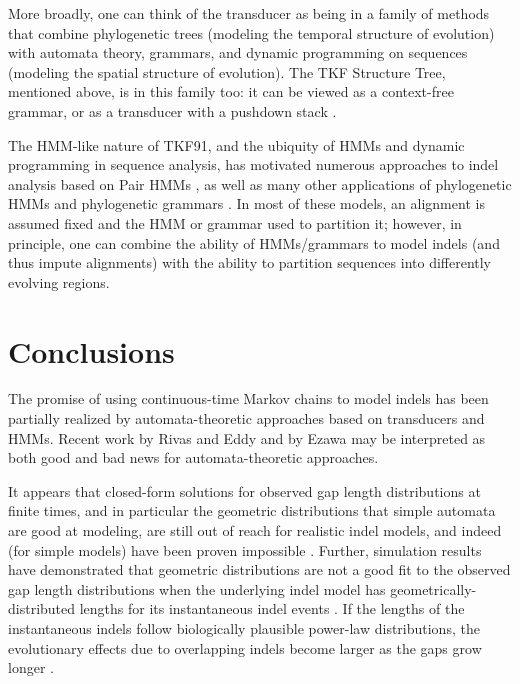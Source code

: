 \documentclass{bmcart}
\begin{document}
More broadly, one can think of the transducer as being in a family of methods
that combine phylogenetic trees (modeling the temporal structure of evolution)
with automata theory, grammars, and dynamic programming on sequences (modeling the spatial structure of evolution).
The TKF Structure Tree, mentioned above, is in this family too:
it can be viewed as a context-free grammar, or as a transducer with a pushdown stack \cite{Holmes2004}.

The HMM-like nature of TKF91, and the ubiquity of HMMs and dynamic programming in sequence analysis,
has motivated numerous approaches to indel analysis based on Pair HMMs
\cite{ThorneEtal92,KnudsenMiyamoto2003,WangKeightleyJohnson2006,RivasEddy2008,RivasEddy2015},
as well as many other applications of 
phylogenetic HMMs \cite{FelsensteinChurchill96,GoldmanEtAl96,PedersenHein2003,SiepelHaussler04,SiepelHaussler04b}
and phylogenetic grammars \cite{KnudsenHein99,KnudsenHein2003,PedersenEtAl04,PedersenEtAl2006,KlostermanEtAl2006,pmid22693624}.
In most of these models, an alignment is assumed fixed and the HMM or grammar used to partition it;
however, in principle, one can combine the ability of HMMs/grammars to model indels (and thus impute alignments)
with the ability to partition sequences into differently evolving regions.

\section*{Conclusions}

The promise of using continuous-time Markov chains to model indels
has been partially realized by automata-theoretic approaches
based on transducers and HMMs.
Recent work by Rivas and Eddy \cite{RivasEddy2015}
and by Ezawa \cite{Ezawa2016a,Ezawa2016b,Ezawa2016bErratum}
may be interpreted as both good and bad news for automata-theoretic approaches.

It appears that closed-form solutions for observed gap length distributions at finite times,
and in particular the geometric distributions that simple automata are good at modeling,
are still out of reach for realistic indel models,
and indeed (for simple models) have been proven impossible \cite{RivasEddy2015}.
Further, simulation results have demonstrated that geometric distributions are not
a good fit to the observed gap length distributions when the underlying indel model
has geometrically-distributed lengths for its instantaneous indel events \cite{RivasEddy2015}.
\color{red}
If the lengths of the instantaneous indels follow biologically plausible power-law
distributions, the evolutionary effects due to overlapping indels become larger as
the gaps grow longer \cite{Ezawa2016a}.
\color{black}
\end{document}
